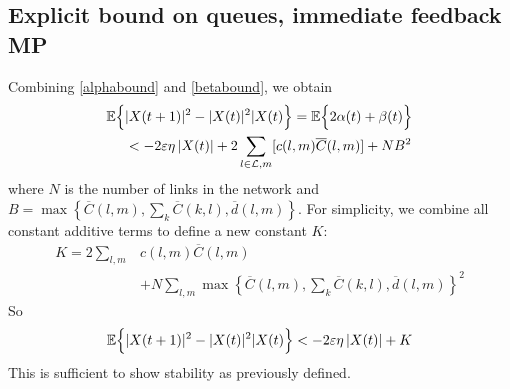 \subsection*{Explicit bound on queues, immediate feedback MP}

Combining \eqref{alphabound} and \eqref{betabound}, we obtain
\begin{align}
\mathbb{E}\Big\{ &|X(t+1)|^{2} - |X(t)|^{2}  |   X(t) \Big\} = \mathbb{E}\Big\{ 2\alpha(t) + \beta(t) \Big\} \nonumber \\
&<  -2\varepsilon \eta \left| X(t ) \right| + 2 \sum_{l \in \mathcal{L},m} [c(l,m)\overline{C} (l,m) ]+ NB^{2}
\end{align}
where $N$ is the number of links in the network and $B=\max\left\{ \overline{C}(l,m), \sum_{k} \overline{C}(k,l),  \overline d (l,m) \right\}$. 
For simplicity, we combine all constant additive terms to define a new constant $K$:
\begin{align}\label{constCalc}
K = 2 \displaystyle\sum_{l,m} & c(l,m) \overline{C}(l,m) \\
\nonumber & + N \displaystyle\sum_{l,m} \max\left\{ \overline{C}(l,m), \sum_{k} \overline{C}(k,l),  \overline d (l,m) \right\}^2
\end{align}
So
\begin{equation}\label{stabBasic}
\expectation{|X(t+1)|^{2} - |X(t)|^{2}  |   X(t)} < -2\varepsilon \eta \left| X(t ) \right| + K
\end{equation}
This is sufficient to show stability as previously defined.


%
%
%
%
%
%

